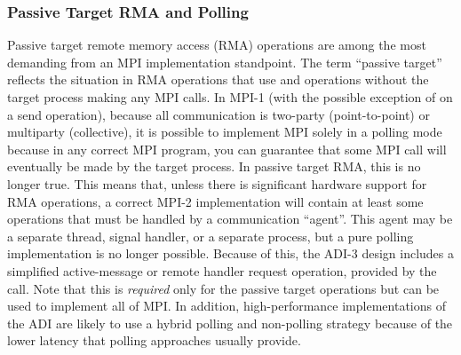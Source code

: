 \documentclass[dvipdfm]{article}
\begin{document}
\subsubsection{Passive Target RMA and Polling}
\label{sec-passive-target}
Passive target remote memory access (RMA) operations are among the
most demanding from an MPI implementation standpoint.  The term
``passive target'' reflects the situation in RMA operations that use
 and  operations without the
target process making any MPI calls.  In MPI-1 (with the possible
exception of  on a send operation), because all
communication is two-party (point-to-point) or multiparty
(collective), it is possible to implement MPI solely in a polling mode
because in any correct MPI program, you can guarantee that some MPI
call will eventually be made by the target process.  In passive target
RMA, this is no longer true.  This means that, unless there is
significant hardware support for RMA operations, a correct MPI-2
implementation will contain at least some operations that must be
handled by a communication ``agent''.  This agent may be a separate
thread, signal handler, or a separate process, but a pure polling
implementation is no longer possible.  Because of this, the ADI-3
design includes a simplified active-message or remote handler request
operation, provided by the  call.  Note that this is
\emph{required} only for the passive target operations but can be used
to implement all of MPI.  In addition, high-performance
implementations of the ADI are likely to use a hybrid polling and non-polling
strategy because of the lower latency that polling approaches usually provide.
\end{document}
